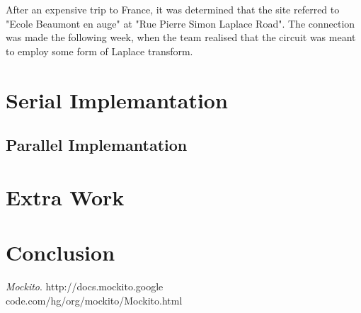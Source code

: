 \documentclass[11pt,twocolumn]{article} %
\begin{document}
After an expensive trip to France, it was determined that the site referred to "Ecole Beaumont en auge" at "Rue Pierre Simon Laplace Road". The connection was made the following week, when the team realised that the circuit was meant to employ some form of Laplace transform.




\section{Serial Implemantation}

\subsection{Parallel Implemantation}



\section{Extra Work}




\section{Conclusion}


\begin{thebibliography}{9}
  \emph{Mockito}.
  http://docs.mockito.google\\code.com/hg/org/mockito/Mockito.html  


  
\end{thebibliography}
\end{document}
